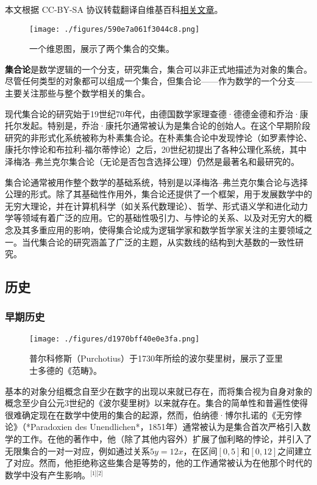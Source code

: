 
本文根据 CC-BY-SA 协议转载翻译自维基百科\href{https://en.wikipedia.org/wiki/Set_theory}{相关文章}。

\begin{figure}[ht]
\centering
\texttt{[image: ./figures/590e7a061f3044c8.png]}
\caption{一个维恩图，展示了两个集合的交集。} \label{fig_Set1_1}
\end{figure}
\textbf{集合论}是数学逻辑的一个分支，研究集合，集合可以非正式地描述为对象的集合。尽管任何类型的对象都可以组成一个集合，但集合论——作为数学的一个分支——主要关注那些与整个数学相关的集合。

现代集合论的研究始于19世纪70年代，由德国数学家理查德·德德金德和乔治·康托尔发起。特别是，乔治·康托尔通常被认为是集合论的创始人。在这个早期阶段研究的非形式化系统被称为朴素集合论。在朴素集合论中发现悖论（如罗素悖论、康托尔悖论和布拉利-福尔蒂悖论）之后，20世纪初提出了各种公理化系统，其中泽梅洛–弗兰克尔集合论（无论是否包含选择公理）仍然是最著名和最研究的。

集合论通常被用作整个数学的基础系统，特别是以泽梅洛–弗兰克尔集合论与选择公理的形式。除了其基础性作用外，集合论还提供了一个框架，用于发展数学中的无穷大理论，并在计算机科学（如关系代数理论）、哲学、形式语义学和进化动力学等领域有着广泛的应用。它的基础性吸引力、与悖论的关系、以及对无穷大的概念及其多重应用的影响，使得集合论成为逻辑学家和数学哲学家关注的主要领域之一。当代集合论的研究涵盖了广泛的主题，从实数线的结构到大基数的一致性研究。
\subsection{历史}  
\subsubsection{早期历史}
\begin{figure}[ht]
\centering
\texttt{[image: ./figures/d1970bff40e0e3fa.png]}
\caption{普尔科修斯（Purchotius）于1730年所绘的波尔斐里树，展示了亚里士多德的《范畴》。} \label{fig_Set1_2}
\end{figure}
基本的对象分组概念自至少在数字的出现以来就已存在，而将集合视为自身对象的概念至少自公元3世纪的《波尔斐里树》以来就存在。集合的简单性和普遍性使得很难确定现在在数学中使用的集合的起源，然而，伯纳德·博尔扎诺的《无穷悖论》（*Paradoxien des Unendlichen*，1851年）通常被认为是集合首次严格引入数学的工作。在他的著作中，他（除了其他内容外）扩展了伽利略的悖论，并引入了无限集合的一对一对应，例如通过关系$5y = 12x$，在区间$[0, 5]$和$[0, 12]$之间建立了对应。然而，他拒绝称这些集合是等势的，他的工作通常被认为在他那个时代的数学中没有产生影响。\(^\text{[1][2]}\)

